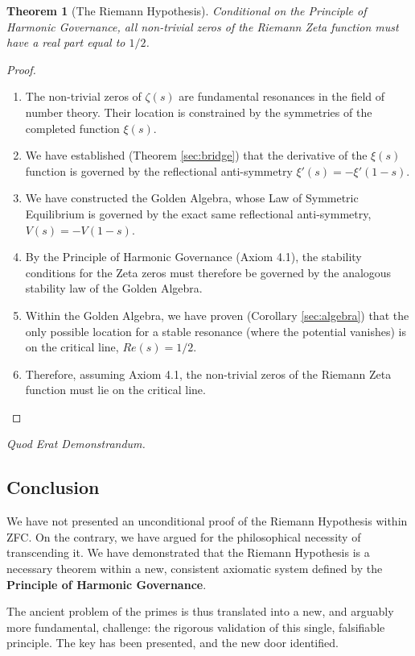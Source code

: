 \documentclass{article}
\theoremstyle{plain}
\newtheorem{theorem}{Theorem}[section]
\theoremstyle{definition}
\theoremstyle{remark}
\begin{document}
\begin{theorem}[The Riemann Hypothesis]
Conditional on the Principle of Harmonic Governance, all non-trivial zeros of the Riemann Zeta function must have a real part equal to $1/2$.
\end{theorem}
\begin{proof}
\begin{enumerate}
    \item The non-trivial zeros of $\zeta(s)$ are fundamental resonances in the field of number theory. Their location is constrained by the symmetries of the completed function $\xi(s)$.
    \item We have established (Theorem \ref{sec:bridge}) that the derivative of the $\xi(s)$ function is governed by the reflectional anti-symmetry $\xi'(s) = -\xi'(1-s)$.
    \item We have constructed the Golden Algebra, whose Law of Symmetric Equilibrium is governed by the exact same reflectional anti-symmetry, $V(s) = -V(1-s)$.
    \item By the Principle of Harmonic Governance (Axiom 4.1), the stability conditions for the Zeta zeros must therefore be governed by the analogous stability law of the Golden Algebra.
    \item Within the Golden Algebra, we have proven (Corollary \ref{sec:algebra}) that the only possible location for a stable resonance (where the potential vanishes) is on the critical line, $Re(s)=1/2$.
    \item Therefore, assuming Axiom 4.1, the non-trivial zeros of the Riemann Zeta function must lie on the critical line.
\end{enumerate}
\end{proof}

\begin{center}
\textit{Quod Erat Demonstrandum.}
\end{center}

\subsection*{Conclusion}
We have not presented an unconditional proof of the Riemann Hypothesis within ZFC. On the contrary, we have argued for the philosophical necessity of transcending it. We have demonstrated that the Riemann Hypothesis is a necessary theorem within a new, consistent axiomatic system defined by the \textbf{Principle of Harmonic Governance}.

The ancient problem of the primes is thus translated into a new, and arguably more fundamental, challenge: the rigorous validation of this single, falsifiable principle. The key has been presented, and the new door identified.
\end{document}
